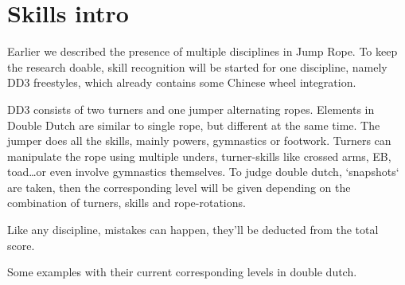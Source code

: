 \section{Skills intro}
\label{subsec:bp-literature-basisskills}

Earlier we described the presence of multiple disciplines in Jump Rope. To keep the research doable, skill recognition will be started for one discipline, namely DD3 freestyles, which already contains some Chinese wheel integration.

\medskip

DD3 consists of two turners and one jumper alternating ropes. Elements in Double Dutch are similar to single rope, but different at the same time. The jumper does all the skills, mainly powers, gymnastics or footwork. Turners can manipulate the rope using multiple unders, turner-skills like crossed arms, EB, toad\dots or even involve gymnastics themselves.
To judge double dutch, `snapshots` are taken, then the corresponding level will be given depending on the combination of turners, skills and rope-rotations.

Like any discipline, mistakes can happen, they'll be deducted from the total score.

Some examples with their current corresponding levels in double dutch.

